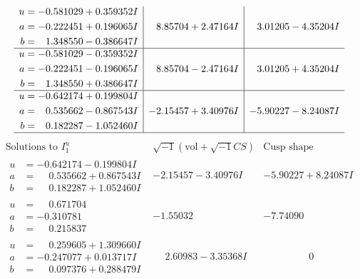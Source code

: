 \documentclass[1p]{elsarticle_modified}
\theoremstyle{definition}
\newcommand{\I}{\sqrt{-1}}
\begin{document}
$$\begin{array}{c|c|c}
\begin{aligned}
u &= -0.581029 + 0.359352 I \\
a &= -0.222451 + 0.196065 I \\
b &= \phantom{-}1.348550 - 0.386647 I\end{aligned}
 & \phantom{-}8.85704 + 2.47164 I & \phantom{-}3.01205 - 4.35204 I \\ \hline\begin{aligned}
u &= -0.581029 - 0.359352 I \\
a &= -0.222451 - 0.196065 I \\
b &= \phantom{-}1.348550 + 0.386647 I\end{aligned}
 & \phantom{-}8.85704 - 2.47164 I & \phantom{-}3.01205 + 4.35204 I \\ \hline\begin{aligned}
u &= -0.642174 + 0.199804 I \\
a &= \phantom{-}0.535662 - 0.867543 I \\
b &= \phantom{-}0.182287 - 1.052460 I\end{aligned}
 & -2.15457 + 3.40976 I & -5.90227 - 8.24087 I\\
 \hline 
 \end{array}$$\newpage$$\begin{array}{c|c|c}  
\text{Solutions to }I^u_{1}& \I (\text{vol} + \sqrt{-1}CS) & \text{Cusp shape}\\
 \hline 
\begin{aligned}
u &= -0.642174 - 0.199804 I \\
a &= \phantom{-}0.535662 + 0.867543 I \\
b &= \phantom{-}0.182287 + 1.052460 I\end{aligned}
 & -2.15457 - 3.40976 I & -5.90227 + 8.24087 I \\ \hline\begin{aligned}
u &= \phantom{-}0.671704\phantom{ +0.000000I} \\
a &= -0.310781\phantom{ +0.000000I} \\
b &= \phantom{-}0.215837\phantom{ +0.000000I}\end{aligned}
 & -1.55032\phantom{ +0.000000I} & -7.74090\phantom{ +0.000000I} \\ \hline\begin{aligned}
u &= \phantom{-}0.259605 + 1.309660 I \\
a &= -0.247077 + 0.013717 I \\
b &= \phantom{-}0.097376 + 0.288479 I\end{aligned}
 & \phantom{-}2.60983 - 3.35368 I & \phantom{-0.000000 } 0 \\ \hline\begin{aligned}

\end{aligned}
\end{array}$$
\end{document}
